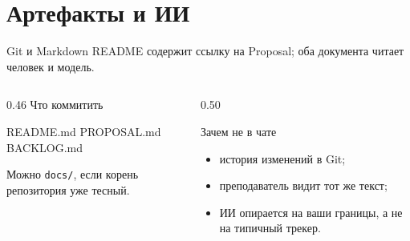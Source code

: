 \section{Артефакты и ИИ}

\begin{frame}[fragile]{Git и Markdown}
  README содержит ссылку на Proposal; оба документа читает человек и модель.

  \medskip
  \begin{columns}[T]
    \begin{column}{0.46\textwidth}
      {\footnotesize Что коммитить}
      \begin{semiverbatim}
README.md
PROPOSAL.md
BACKLOG.md
      \end{semiverbatim}
      \vspace{0.45em}
      {\footnotesize\color{acGray}
      Можно \texttt{docs/}, если корень репозитория уже тесный.}
    \end{column}
    \begin{column}{0.50\textwidth}
      \begin{block}{Зачем не в чате}
        \begin{itemize}
          \item история изменений в Git;
          \item преподаватель видит тот же текст;
          \item ИИ опирается на ваши границы, а не на \flqq типичный трекер\frqq.
        \end{itemize}
      \end{block}
    \end{column}
  \end{columns}
\end{frame}
